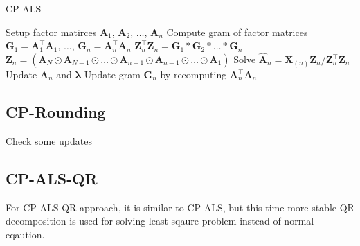 \documentclass{article}
\newcommand{\mat}[1]{\mathbf{#1}}
\newcommand{\M}[2][]{\bm{#1{\mathbf{\MakeUppercase{#2}}}}} 		%
\newcommand{\T}[2][]{#1{\mathbf{\cal{#2}}}} 						%
\begin{document}
\begin{algorithm}[!ht]
  \caption{CP-ALS}
  \label{alg:cp-als}
  \begin{algorithmic}[1]\footnotesize
    
    \Function{$[\bm{\lambda},\M{A}_{n}]=$ CP-ALS}{$\T{X},R$}
      \State Setup factor matirces  $\mat{A}_1$, $\mat{A}_2$, $\dots$, $\mat{A}_n$
      \State Compute gram of factor matrices $\mat{G}_1 = \mat{A}_1^\top \mat{A}_1$, $\dots$, $\mat{G}_n = \mat{A}_n^\top \mat{A}_n$  
      \State $\mat{Z}_n^\top\mat{Z}_n = \mat{G}_1 \ast \mat{G}_2 \ast \dots \ast \mat{G}_n$
      \State $\mat{Z}_n =  (\mat{A}_N \odot \mat{A}_{N-1} \odot \dots \odot \mat{A}_{n+1} \odot \mat{A}_{n-1} \odot \dots \odot \mat{A}_1)$
      \State Solve $\mat{\hat{A}}_n = \mat{X}_{(n)}\mat{Z}_n / \mat{Z}_n^\top\mat{Z}_n$
      \State Update $\mat{A}_n$ and $\bm{\lambda}$
      \State Update gram $\mat{G}_n$ by recomputing $\mat{A}_n^\top\mat{A}_n$
      
      \EndFor
      \EndWhile
    \EndFunction
    
  \end{algorithmic}
\end{algorithm}

\subsection*{CP-Rounding}
Check some updates

\subsection*{CP-ALS-QR}
For CP-ALS-QR approach, it is similar to CP-ALS, but this time more stable QR decomposition is used for solving least sqaure
problem instead of normal eqaution.
\end{document}

